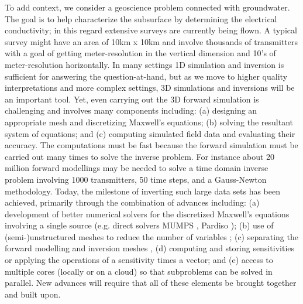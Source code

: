 \documentclass[paper]{geophysics}
\begin{document}
To add context, we consider a geoscience problem connected with groundwater. The goal is to help characterize the subsurface by determining the electrical conductivity; in this regard extensive surveys are currently being flown. A typical survey might have an area of 10km x 10km and  involve thousands of transmitters with a goal of getting meter-resolution in the vertical dimension and 10’s of meter-resolution horizontally. In many settings 1D simulation and inversion is sufficient for answering the question-at-hand, but as we move to higher quality interpretations and more complex settings, 3D simulations and inversions will be an important tool. Yet, even carrying out the 3D forward simulation is challenging and involves many components including: (a) designing an appropriate mesh and discretizing Maxwell’s equations; (b) solving the resultant system of equations; and (c) computing simulated field data and evaluating their accuracy. The computations must be fast because the forward simulation must be carried out many times to solve the inverse problem. For instance about 20 million forward modellings may be needed to solve a time domain inverse problem involving 1000 transmitters, 50 time steps, and a Gauss-Newton methodology. Today, the milestone of inverting such large data sets has been achieved, primarily through the combination of advances including: (a) development of better numerical solvers for the discretized Maxwell’s equations involving a single source (e.g. direct solvers MUMPS \citep{Amestoy2001, Amestoy2006}, Pardiso \citep{DeConinck2016, Verbosio2017, Kourounis2018}); (b) use of (semi-)unstructured meshes to reduce the number of variables \citep{Haber2007}; (c) separating the forward modelling and inversion meshes \citep{Yang2014a, Haber2014b}, (d) computing and storing sensitivities or applying the operations of a sensitivity times a vector; and (e) access to multiple cores (locally or on a cloud) so that subproblems can be solved in parallel. New advances will require that all of these elements be brought together and built upon.
\end{document}
